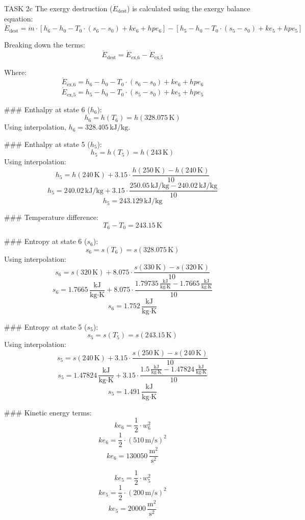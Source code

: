 TASK 2c  
The exergy destruction (\( \dot{E}_{\text{dest}} \)) is calculated using the exergy balance equation:  
\[
\dot{E}_{\text{dest}} = \dot{m} \cdot \left[ h_6 - h_0 - T_0 \cdot (s_6 - s_0) + ke_6 + hpe_6 \right] - \left[ h_5 - h_0 - T_0 \cdot (s_5 - s_0) + ke_5 + hpe_5 \right]
\]

Breaking down the terms:  
\[
\dot{E}_{\text{dest}} = \dot{E}_{\text{ex,6}} - \dot{E}_{\text{ex,5}}
\]

Where:  
\[
\dot{E}_{\text{ex,6}} = h_6 - h_0 - T_0 \cdot (s_6 - s_0) + ke_6 + hpe_6
\]
\[
\dot{E}_{\text{ex,5}} = h_5 - h_0 - T_0 \cdot (s_5 - s_0) + ke_5 + hpe_5
\]

### Enthalpy at state 6 (\( h_6 \)):  
\[
h_6 = h(T_6) = h(328.075 \, \text{K})
\]
Using interpolation, \( h_6 = 328.405 \, \text{kJ/kg} \).

### Enthalpy at state 5 (\( h_5 \)):  
\[
h_5 = h(T_5) = h(243 \, \text{K})
\]
Using interpolation:  
\[
h_5 = h(240 \, \text{K}) + 3.15 \cdot \frac{h(250 \, \text{K}) - h(240 \, \text{K})}{10}
\]
\[
h_5 = 240.02 \, \text{kJ/kg} + 3.15 \cdot \frac{250.05 \, \text{kJ/kg} - 240.02 \, \text{kJ/kg}}{10}
\]
\[
h_5 = 243.129 \, \text{kJ/kg}
\]

### Temperature difference:  
\[
T_6 - T_0 = 243.15 \, \text{K}
\]

### Entropy at state 6 (\( s_6 \)):  
\[
s_6 = s(T_6) = s(328.075 \, \text{K})
\]
Using interpolation:  
\[
s_6 = s(320 \, \text{K}) + 8.075 \cdot \frac{s(330 \, \text{K}) - s(320 \, \text{K})}{10}
\]
\[
s_6 = 1.7665 \, \frac{\text{kJ}}{\text{kg·K}} + 8.075 \cdot \frac{1.79735 \, \frac{\text{kJ}}{\text{kg·K}} - 1.7665 \, \frac{\text{kJ}}{\text{kg·K}}}{10}
\]
\[
s_6 = 1.752 \, \frac{\text{kJ}}{\text{kg·K}}
\]

### Entropy at state 5 (\( s_5 \)):  
\[
s_5 = s(T_5) = s(243.15 \, \text{K})
\]
Using interpolation:  
\[
s_5 = s(240 \, \text{K}) + 3.15 \cdot \frac{s(250 \, \text{K}) - s(240 \, \text{K})}{10}
\]
\[
s_5 = 1.47824 \, \frac{\text{kJ}}{\text{kg·K}} + 3.15 \cdot \frac{1.5 \, \frac{\text{kJ}}{\text{kg·K}} - 1.47824 \, \frac{\text{kJ}}{\text{kg·K}}}{10}
\]
\[
s_5 = 1.491 \, \frac{\text{kJ}}{\text{kg·K}}
\]

### Kinetic energy terms:  
\[
ke_6 = \frac{1}{2} \cdot w_6^2
\]
\[
ke_6 = \frac{1}{2} \cdot (510 \, \text{m/s})^2
\]
\[
ke_6 = 130050 \, \frac{\text{m}^2}{\text{s}^2}
\]

\[
ke_5 = \frac{1}{2} \cdot w_5^2
\]
\[
ke_5 = \frac{1}{2} \cdot (200 \, \text{m/s})^2
\]
\[
ke_5 = 20000 \, \frac{\text{m}^2}{\text{s}^2}
\]